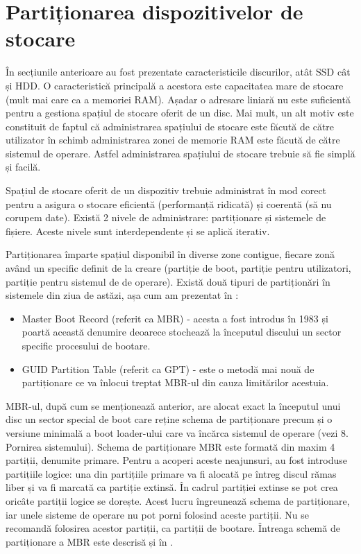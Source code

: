 \section{Partiționarea dispozitivelor de stocare}
\label{sec:storage-part}

În secțiunile anterioare au fost prezentate caracteristicile discurilor, atât
SSD cât și HDD. O caracteristică principală a acestora este capacitatea mare de
stocare (mult mai care ca a memoriei RAM). Așadar o adresare liniară nu este
suficientă pentru a gestiona spațiul de stocare oferit de un disc. Mai mult, un
alt motiv este constituit de faptul că administrarea spațiului de stocare este
făcută de către utilizator în schimb administrarea zonei de memorie RAM este
făcută de către sistemul de operare. Astfel administrarea spațiului de stocare
trebuie să fie simplă și facilă.

Spațiul de stocare oferit de un dispozitiv trebuie administrat în mod corect
pentru a asigura o stocare eficientă (performanță ridicată) și coerentă (să nu
corupem date). Există 2 nivele de administrare: partiționare și sistemele de
fișiere. Aceste nivele sunt interdependente și se aplică iterativ.

Partiționarea împarte spațiul disponibil în diverse zone contigue, fiecare zonă
având un specific definit de la creare (partiție de boot, partiție pentru
utilizatori, partiție pentru sistemul de de operare). Există două tipuri de
partiționări în sistemele din ziua de astăzi, așa cum am prezentat în
:

\begin{itemize}
	\item Master Boot Record (referit ca MBR) - acesta a fost introdus în
		1983 și poartă această denumire deoarece stochează la începutul
		discului un sector specific procesului de bootare.
	\item GUID Partition Table (referit ca GPT) - este o metodă mai nouă de
		partiționare ce va înlocui treptat MBR-ul din cauza limitărilor
		acestuia.
\end{itemize}

MBR-ul, după cum se menționează anterior, are alocat exact la începutul unui
disc un sector special de boot care reține schema de partiționare precum și o
versiune minimală a boot loader-ului care va încărca sistemul de operare (vezi
8. Pornirea sistemului). Schema de partiționare MBR este formată din maxim 4
partiții, denumite primare. Pentru a acoperi aceste neajunsuri, au fost
introduse partițiile logice: una din partițiile primare va fi alocată pe întreg
discul rămas liber și va fi marcată ca partiție extinsă. În cadrul partiției
extinse se pot crea oricâte partiții logice se dorește. Acest lucru îngreunează
schema de partiționare, iar unele sisteme de operare nu pot porni folosind
aceste partiții. Nu se recomandă folosirea acestor partiții, ca partiții de
bootare. Întreaga schemă de partiționare a MBR este descrisă și în
.

